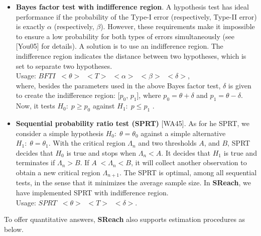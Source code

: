 \documentclass[runningheads,a4paper]{llncs}
\begin{document}
\begin{itemize}
\item {\bf Bayes factor test with indifference region}. 
A hypothesis test has ideal performance if the probability of the Type-I error (respectively, Type-II error) is exactly $\alpha$ (respectively, $\beta$). However, these requirements make it impossible to ensure a low probability for both types of errors simultaneously (see [You05] for details). A solution is to use an indifference region. The indifference region indicates the distance between two hypotheses, which is set to separate two hypotheses.\\
Usage: $BFTI \;\;<\theta> \;\;<T>\;\; <\alpha> \;\;<\beta> \;\;<\delta>$,\\
where, besides the parameters used in the above Bayes factor test, $\delta$ is given to create the indifference region: [$p_0$, $p_1$], where $p_0 = \theta + \delta$ and $p_1 = \theta  - \delta$.  Now, it tests $H_0 :\; p \ge p_0$ against $H_1:\; p \le p_1$ .\\

\item {\bf Sequential probability ratio test (SPRT)} [WA45]. 
As for he SPRT, we consider a simple hypothesis $H_0:\;\theta = \theta_0$ against a simple alternative $H_1:\;\theta = \theta_1$. With the critical region $\Lambda_n$ and two thresholds $A$, and $B$, SPRT decides that $H_0$ is true and stops when $\Lambda_n < A$. It decides that $H_1$ is true and terminates if $\Lambda_n > B$. If $A\; < \Lambda_n < B$, it will collect another observation to obtain a new critical region $\Lambda_{n+1}$. The SPRT is optimal, among all sequential tests, in the sense that it minimizes the average sample size. In {\bf SReach}, we have implemented SPRT with indifference region.\\ 
Usage: $SPRT\;\; <\theta> \;\;<T>\;\; <\delta>$.
\end{itemize}
To offer quantitative answers, {\bf SReach} also supports estimation procedures as below.
\end{document}
